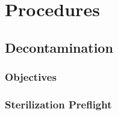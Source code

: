 \section{Procedures}
\label{sec:Procedures}

\subsection{Decontamination}
\label{subsec:Decontamination}

\subsubsection{Objectives}

\subsubsection{Sterilization Preflight}

